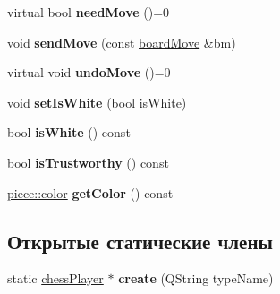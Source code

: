 \begin{DoxyCompactItemize}
\item 
\hypertarget{classchess_player_ad67bfb6b97ef3901d69b3ab86f0ee543}{}virtual bool {\bfseries need\+Move} ()=0\label{classchess_player_ad67bfb6b97ef3901d69b3ab86f0ee543}

\item 
\hypertarget{classchess_player_a34001badc8835ee50ba3cf7757bd5b49}{}void {\bfseries send\+Move} (const \hyperlink{classboard_move}{board\+Move} \&bm)\label{classchess_player_a34001badc8835ee50ba3cf7757bd5b49}

\item 
\hypertarget{classchess_player_ade3cee86e542229ac6475867afd8fdde}{}virtual void {\bfseries undo\+Move} ()=0\label{classchess_player_ade3cee86e542229ac6475867afd8fdde}

\item 
\hypertarget{classchess_player_aef6c947b54414da53ac4491e1f8488b7}{}void {\bfseries set\+Is\+White} (bool is\+White)\label{classchess_player_aef6c947b54414da53ac4491e1f8488b7}

\item 
\hypertarget{classchess_player_a7b2cb6f6e5c85185fc6ca5f74610eb70}{}bool {\bfseries is\+White} () const \label{classchess_player_a7b2cb6f6e5c85185fc6ca5f74610eb70}

\item 
\hypertarget{classchess_player_abe6500db94378533534d7bee0e7b9719}{}bool {\bfseries is\+Trustworthy} () const \label{classchess_player_abe6500db94378533534d7bee0e7b9719}

\item 
\hypertarget{classchess_player_a090b0e10bfcf88f98e4e28109b354947}{}\hyperlink{classpiece_a0e121e5952345fd0e7014a8e6a1fbbda}{piece\+::color} {\bfseries get\+Color} () const \label{classchess_player_a090b0e10bfcf88f98e4e28109b354947}

\end{DoxyCompactItemize}
\subsection*{Открытые статические члены}
\begin{DoxyCompactItemize}
\item 
\hypertarget{classchess_player_a9e9f6a9fb3e7a52bf8704afea2f8bd3e}{}static \hyperlink{classchess_player}{chess\+Player} $\ast$ {\bfseries create} (Q\+String type\+Name)\label{classchess_player_a9e9f6a9fb3e7a52bf8704afea2f8bd3e}

\end{DoxyCompactItemize}
